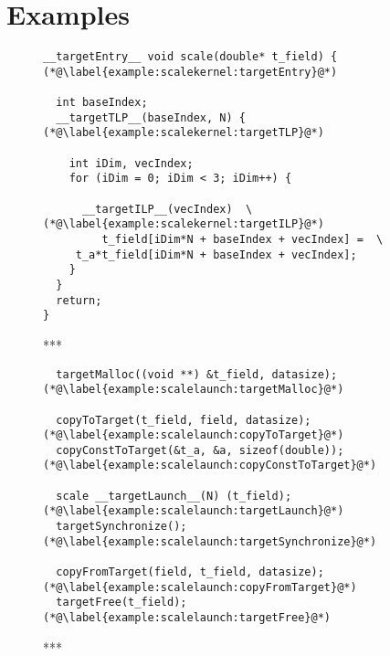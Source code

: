 \chapter{Examples}\label{chapter:examples}
\begin{comment}
TO DO: describe this example. 
\end{comment}
\begin{figure}[h]
\begin{lstlisting}
__targetEntry__ void scale(double* t_field) { (*@\label{example:scalekernel:targetEntry}@*) 

  int baseIndex;
  __targetTLP__(baseIndex, N) { (*@\label{example:scalekernel:targetTLP}@*) 

    int iDim, vecIndex;
    for (iDim = 0; iDim < 3; iDim++) {

      __targetILP__(vecIndex)  \ (*@\label{example:scalekernel:targetILP}@*) 
         t_field[iDim*N + baseIndex + vecIndex] =  \
	 t_a*t_field[iDim*N + baseIndex + vecIndex];       	  
    }
  }
  return;
}
\end{lstlisting}
\caption{***}\label{fig:scalekernel}
\end{figure}

\begin{figure}[h]
\begin{lstlisting}
  targetMalloc((void **) &t_field, datasize); (*@\label{example:scalelaunch:targetMalloc}@*) 
  
  copyToTarget(t_field, field, datasize); (*@\label{example:scalelaunch:copyToTarget}@*) 
  copyConstToTarget(&t_a, &a, sizeof(double)); (*@\label{example:scalelaunch:copyConstToTarget}@*) 
  
  scale __targetLaunch__(N) (t_field); (*@\label{example:scalelaunch:targetLaunch}@*) 
  targetSynchronize();(*@\label{example:scalelaunch:targetSynchronize}@*) 
  
  copyFromTarget(field, t_field, datasize); (*@\label{example:scalelaunch:copyFromTarget}@*) 
  targetFree(t_field); (*@\label{example:scalelaunch:targetFree}@*) 
\end{lstlisting}
\caption{***}\label{fig:scalelaunch}
\end{figure}

